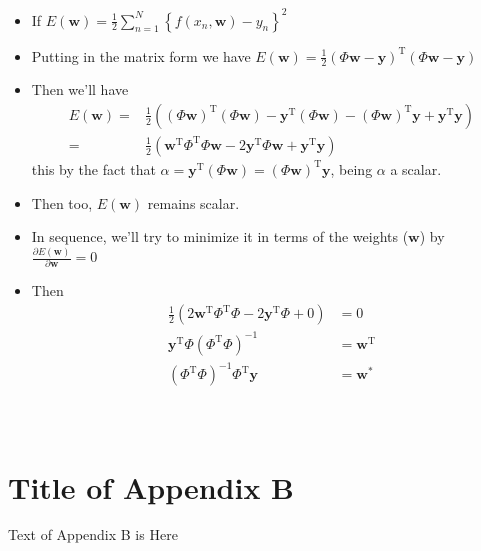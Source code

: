 \begin{itemize}
    \item If $E(\mathbf{w})=\frac{1}{2} \sum_{n=1}^{N}\left\{f\left(x_{n}, \mathbf{w}\right)-y_{n}\right\}^{2}$
    \item Putting in the matrix form we have $E(\mathbf{w}) = \frac{1}{2} \left( \Phi \mathbf{w} - \mathbf{y} \right)^{\mathrm{T}}\left( \Phi \mathbf{w} - \mathbf{y} \right)$     \item Then we'll have 
    \begin{align*}
        E(\mathbf{w}) =& \frac{1}{2} \left( ( \Phi \mathbf{w})^{\mathrm{T}}( \Phi \mathbf{w}) -  \mathbf{y}^{\mathrm{T}}( \Phi \mathbf{w}) - ( \Phi \mathbf{w})^{\mathrm{T}}\mathbf{y} + \mathbf{y}^{\mathrm{T}}\mathbf{y} \right) \\
                   =& \frac{1}{2} \left( \mathbf{w}^{\mathrm{T}} \Phi^{\mathrm{T}} \Phi \mathbf{w} -  2\mathbf{y}^{\mathrm{T}} \Phi \mathbf{w} + \mathbf{y}^{\mathrm{T}}\mathbf{y} \right)
    \end{align*}
    this by the fact that $\alpha =  \mathbf{y}^{\mathrm{T}}( \Phi \mathbf{w}) = ( \Phi \mathbf{w})^{\mathrm{T}}\mathbf{y}$, being $\alpha$ a scalar.
    \item Then too, $E(\mathbf{w})$	 remains scalar.
    \item In sequence, we'll try to minimize it in terms of the weights ($\mathbf{w}$) by $
\frac{\partial E(\mathbf{w})}{\partial \mathbf{w}} = 0$
    \item Then
            \begin{align*}
				\frac{1}{2} \left( 2 \mathbf{w}^{\mathrm{T}} \Phi^{\mathrm{T}} \Phi  -  2\mathbf{y}^{\mathrm{T}} \Phi + 0 \right) &= 0 \\
                \mathbf{y}^{\mathrm{T}} \Phi \left( \Phi^{\mathrm{T}} \Phi \right)^{-1} &= \mathbf{w}^{\mathrm{T}} \\
				\left( \Phi^{\mathrm{T}} \Phi \right)^{-1}\Phi^{\mathrm{T}} \mathbf{y} &= \mathbf{w}^* 
			\end{align*}
\end{itemize}

\section{\\Title of Appendix B}

Text of Appendix B is Here